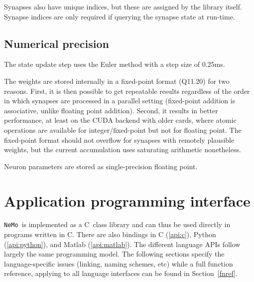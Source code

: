 \documentclass[a4paper]{article}
\newcommand{\nemo}{\texttt{NeMo}}
\newcommand{\cpp}{C\nolinebreak\hspace{-.05em}\raisebox{.4ex}{\tiny\bf +}\nolinebreak\hspace{-.10em}\raisebox{.4ex}{\tiny\bf +}}
\begin{document}
Synapses also have unique indices, but these are assigned by the library itself.
Synapse indices are only required if querying the synapse state at run-time.

\subsection{Numerical precision}

The state update step uses the Euler method with a step size of 0.25ms. 

The weights are stored internally in a fixed-point format (Q11.20) for two reasons.
First,
	it is then possible to get repeatable results regardless of the order in which synapses are processed in a parallel setting (fixed-point addition is associative, unlike floating point addition).
Second, 
	it results in better performance,
		at least on the CUDA backend with older cards,
		where atomic operations are available for integer/fixed-point but not for floating point. 
The fixed-point format should not overflow for synapses with remotely plausible weights,
	but the current accumulation uses saturating arithmetic nonetheless.

Neuron parameters are stored as single-precision floating point.






% 

\section{Application programming interface}
\label{api}

\nemo\ is implemented as a \cpp\ class library and can thus be used directly in programs written in \cpp.
There are also bindings in
	C (\ref{api:c}),
	Python (\ref{api:python}),
	and Matlab (\ref{api:matlab}).
The different language APIs follow largely the same programming model.
The following sections specify the language-specific issues
	(linking, naming schemes, etc)
	while a full function reference, applying to all language interfaces can be found in Section~\ref{fnref}.
\end{document}

